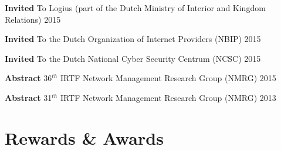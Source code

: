 \documentclass[print]{styles/friggeri-cv-mac} %
\begin{document}
\begin{entrylist}

\vspace{-0.3cm}
\entry
{\textbf{Invited}}
{\textnormal{To Logius (part of the Dutch Ministry of Interior and Kingdom Relations)}}
{2015}

\vspace{-0.3cm}
\entry
{\textbf{Invited}}
{\textnormal{To the Dutch Organization of Internet Providers (NBIP)}}
{2015}

\vspace{-0.3cm}
\entry
{\textbf{Invited}}
{\textnormal{To the Dutch National Cyber Security Centrum (NCSC)}}
{2015}

\vspace{-0.3cm}
\entry
{\textbf{Abstract}}
{\textnormal{36$^{th}$ IRTF Network Management Research Group (NMRG)}}
{2015}

\vspace{-0.3cm}
\entry
{\textbf{Abstract}}
{\textnormal{31$^{th}$ IRTF Network Management Research Group (NMRG)}}
{2013}


\end{entrylist}

\section{Rewards \& Awards}\vspace{-5pt}
\end{document}
